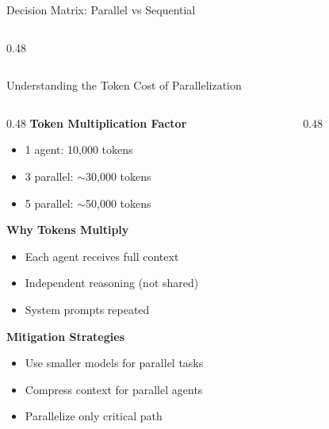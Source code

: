 \documentclass[aspectratio=169,11pt]{beamer}
\begin{document}
\begin{frame}{Decision Matrix: Parallel vs Sequential}
\begin{columns}[T]
\begin{column}{0.48\textwidth}
        \end{column}
    \end{columns}
\end{frame}

\begin{frame}{Understanding the Token Cost of Parallelization}
    \begin{columns}[T]
        \begin{column}{0.48\textwidth}
            \textbf{Token Multiplication Factor}
            \begin{itemize}
                \item 1 agent: 10,000 tokens
                \item 3 parallel: $\sim$30,000 tokens
                \item 5 parallel: $\sim$50,000 tokens
            \end{itemize}

            \vspace{0.3cm}
            \textbf{Why Tokens Multiply}
            \begin{itemize}
                \item Each agent receives full context
                \item Independent reasoning (not shared)
                \item System prompts repeated
            \end{itemize}

            \vspace{0.3cm}
            \textbf{Mitigation Strategies}
            \begin{itemize}
                \item Use smaller models for parallel tasks
                \item Compress context for parallel agents
                \item Parallelize only critical path
            \end{itemize}
        \end{column}
        \begin{column}{0.48\textwidth}
\end{column}
\end{columns}
\end{frame}
\end{document}
